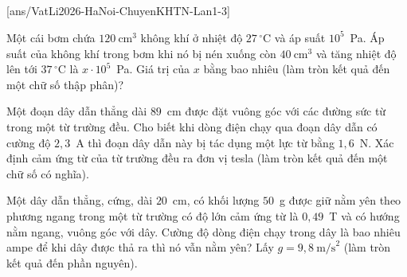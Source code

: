 	\subsection*{}
	\setcounter{ex}{0}
	[ans/VatLi2026-HaNoi-ChuyenKHTN-Lan1-3]

	\begin{ex}%
		Một cái bơm chứa $120~\text{cm}^3$ không khí ở nhiệt độ $27\,^\circ\text{C}$ và áp suất $10^5$~Pa. Áp suất của không khí trong bơm khi nó bị nén xuống còn $40~\text{cm}^3$ và tăng nhiệt độ lên tới $37\,^\circ\text{C}$ là $x\cdot 10^5$~Pa. Giá trị của $x$ bằng bao nhiêu (làm tròn kết quả đến một chữ số thập phân)?
		\par
	\end{ex}

	\begin{ex}%
		Một đoạn dây dẫn thẳng dài $89$~cm được đặt vuông góc với các đường sức từ trong một từ trường đều. Cho biết khi dòng điện chạy qua đoạn dây dẫn có cường độ $2{,}3$~A thì đoạn dây dẫn này bị tác dụng một lực từ bằng $1{,}6$~N. Xác định cảm ứng từ của từ trường đều ra đơn vị tesla (làm tròn kết quả đến một chữ số có nghĩa).
		\par
	\end{ex}

	\begin{ex}%
		Một dây dẫn thẳng, cứng, dài $20$~cm, có khối lượng $50$~g được giữ nằm yên theo phương ngang trong một từ trường có độ lớn cảm ứng từ là $0{,}49$~T và có hướng nằm ngang, vuông góc với dây. Cường độ dòng điện chạy trong dây là bao nhiêu ampe để khi dây được thả ra thì nó vẫn nằm yên? Lấy $g=9{,}8~\text{m/s}^2$ (làm tròn kết quả đến phần nguyên).
		\par
	\end{ex}


